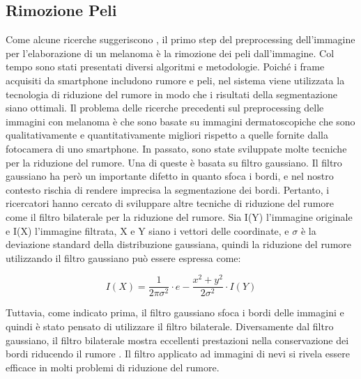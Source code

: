 {\subsection{Rimozione Peli}
Come alcune ricerche suggeriscono \cite{chatterjee2019integration, gutierrez2017skin}, il primo step del preprocessing dell'immagine per l'elaborazione di un melanoma è la rimozione dei peli dall'immagine.
\newline
Col tempo sono stati presentati diversi algoritmi e metodologie.
Poiché i frame acquisiti da smartphone includono rumore e peli, nel sistema viene utilizzata la tecnologia di riduzione del rumore in modo che i risultati della segmentazione siano ottimali.
\newline
Il problema delle ricerche precedenti sul preprocessing delle immagini con melanoma è che sono basate su immagini dermatoscopiche che sono qualitativamente e quantitativamente migliori rispetto a quelle fornite dalla fotocamera di uno smartphone.
\newline
\newline
In passato, sono state sviluppate molte tecniche per la riduzione del rumore. Una di queste è basata su filtro gaussiano. \cite{xu1999segmentation} 
\newline
Il filtro gaussiano ha però un importante difetto in quanto sfoca i bordi, e nel nostro contesto rischia di rendere imprecisa la segmentazione dei bordi. 
\newline
Pertanto, i ricercatori hanno cercato di sviluppare altre tecniche di riduzione del rumore come il filtro bilaterale per la riduzione del rumore. 
\newline
Sia I(Y) l'immagine originale e I(X) l'immagine filtrata, X e Y siano i vettori delle coordinate, e $\sigma$ è la deviazione standard della distribuzione gaussiana, quindi la riduzione del rumore utilizzando il filtro gaussiano può essere espressa come: \cite{haddad1991class,nixon2019feature}
\begin{center}
	\begin{equation}
I(X)= \frac{1}{2\pi\sigma^2 }\cdot e -\frac{x^2 + y^2}{2\sigma^2}\cdot I(Y)
	\end{equation}
\end{center}
Tuttavia, come indicato prima, il filtro gaussiano sfoca i bordi delle immagini e quindi è stato pensato di utilizzare il filtro bilaterale.
\newline
Diversamente dal filtro gaussiano, il filtro bilaterale mostra eccellenti prestazioni nella conservazione dei bordi riducendo il rumore \cite{tomasi1998bilateral}. Il filtro applicato ad immagini di nevi si rivela essere efficace in molti problemi di riduzione del rumore.
}

